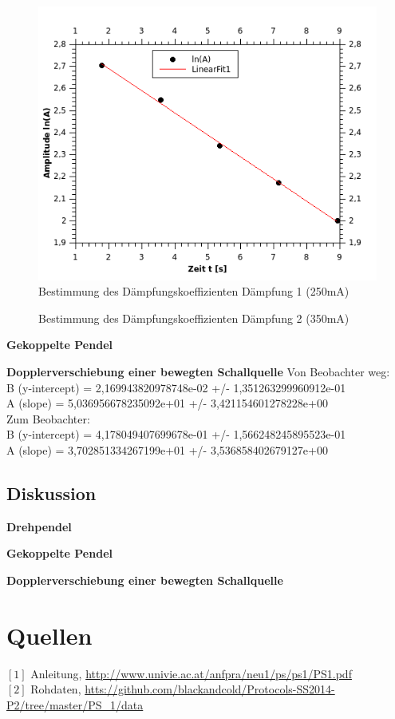 \documentclass[12pt,a4paper]{article}
\begin{document}
\begin{multicols}{2}
\begin{figure}[H]
	\centering
	\includegraphics[scale=2]{./figure/Messung1_Daempfung_omega0.png}
	\caption{Bestimmung des Dämpfungskoeffizienten Dämpfung 1 (250mA)}
	\label{fig:daempfung_omega0_1}
\end{figure}


\begin{figure}[H]
	\centering
	\caption{Bestimmung des Dämpfungskoeffizienten Dämpfung 2 (350mA)}
	\label{fig:daempfung_omega0_2}
\end{figure}

\textbf{Gekoppelte Pendel}



\textbf{Dopplerverschiebung einer bewegten Schallquelle}
Von Beobachter weg:\\
B (y-intercept) = 2,169943820978748e-02 +/- 1,351263299960912e-01\\
A (slope) = 5,036956678235092e+01 +/- 3,421154601278228e+00\\

Zum Beobachter:\\
B (y-intercept) = 4,178049407699678e-01 +/- 1,566248245895523e-01\\
A (slope) = 3,702851334267199e+01 +/- 3,536858402679127e+00\\

\pagebreak
\subsection{Diskussion}
\textbf{Drehpendel}

\textbf{Gekoppelte Pendel}

\textbf{Dopplerverschiebung einer bewegten Schallquelle}


\section{Quellen}
$[1]$ Anleitung, \url{http://www.univie.ac.at/anfpra/neu1/ps/ps1/PS1.pdf}\\
$[2]$ Rohdaten, \url{htts://github.com/blackandcold/Protocols-SS2014-P2/tree/master/PS_1/data}\\

\end{multicols}
\end{document}
